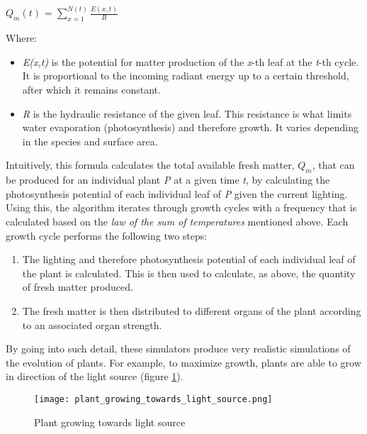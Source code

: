 \begin{center}	
\textit{$Q_{m}(t)$} = $\sum_{x=1}^{N(t)} \frac{E(x,t)}{R} $
\end{center}
Where:
\begin{itemize}
\item \textit{E(x,t)} is the potential for matter production of the \textit{x}-th leaf at the \textit{t}-th cycle. It is proportional to the incoming radiant energy up to a certain threshold, after which it remains constant. 
\item \textit{R} is the hydraulic resistance of the given leaf. This resistance is what limits water evaporation (photosynthesis) and therefore growth. It varies depending in the species and surface area.
\end{itemize} 
Intuitively, this formula calculates the total available fresh matter, \textit{$Q_{m}$}, that can be produced for an individual plant \textit{P} at a given time \textit{t}, by calculating the photosynthesis potential of each individual leaf of \textit{P} given the current lighting.\\

Using this, the algorithm iterates through growth cycles with a frequency that is calculated based on the \textit{law of the sum of temperatures} mentioned above. Each growth cycle performs the following two steps:
\begin{enumerate}
\item The lighting and therefore photosynthesis potential of each individual leaf of the plant is calculated. This is then used to calculate, as above, the quantity of fresh matter produced.
\item The fresh matter is then distributed to different organs of the plant according to an associated organ strength.
\end{enumerate}

By going into such detail, these simulators produce very realistic simulations of the evolution of plants. For example, to maximize growth, plants are able to grow in direction of the light source (figure \ref{fig:plant_growing_towards_light_source}).\\

\begin{figure}[h]
  \centering
	    \texttt{[image: plant\_growing\_towards\_light\_source.png]}
	\caption{Plant growing towards light source ~\cite{Soler2001} }
	\label{fig:plant_growing_towards_light_source}
\end{figure}


